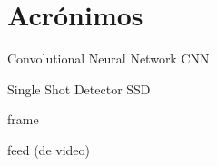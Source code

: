 \chapter*{Acrónimos}
\label{chap:acro}


\begin{acronym}[Raspberry]
\end{acronym}

\begin{acronym}[2D]
\end{acronym}

\begin{acronym}[3D]
\end{acronym}

\begin{acronym}[ID]
\end{acronym}


Convolutional Neural Network CNN 

Single Shot Detector SSD


frame

feed (de video)
